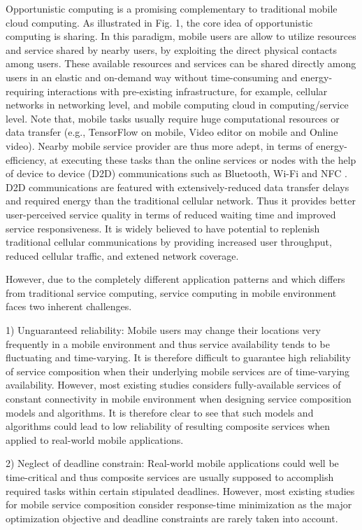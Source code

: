 \documentclass[journal]{IEEEtran}
\begin{document}
Opportunistic computing is a promising complementary to traditional mobile cloud computing. As illustrated in Fig. 1, the core idea of opportunistic computing is sharing. In this paradigm, mobile users are allow to utilize resources and service shared by nearby users, by exploiting the direct physical contacts among users.
These available resources and services can be shared directly among users in an elastic and on-demand way without time-consuming and energy-requiring interactions with pre-existing infrastructure, for example, cellular networks in networking level, and mobile computing cloud in computing/service level.
Note that, mobile tasks usually require huge computational resources or data transfer (e.g., TensorFlow on mobile, Video editor on mobile and Online video). Nearby mobile service provider are thus more adept, in terms of energy-efficiency, at executing these tasks than the online services or nodes with the help of device to device (D2D) communications such as Bluetooth, Wi-Fi and NFC \cite{balani2007energy}. D2D communications are featured with extensively-reduced data transfer delays and required energy than the traditional cellular network. Thus it provides better user-perceived service quality in terms of reduced waiting time and improved service responsiveness. It is widely believed to have potential to replenish traditional cellular communications by providing increased user throughput, reduced cellular traffic, and extened network coverage.

However, due to the completely different application patterns and which differs from traditional service computing, service computing in mobile environment faces two inherent challenges.

1) Unguaranteed reliability: Mobile users may change their locations very frequently in a mobile environment and thus service availability tends to be fluctuating and time-varying. It is therefore difficult to guarantee high reliability of service composition when their underlying mobile services are of time-varying availability. However, most existing studies considers fully-available services of constant connectivity in mobile environment when designing service composition models and algorithms. It is therefore clear to see that such models and algorithms could lead to low reliability of resulting composite services when applied to real-world mobile applications.

2) Neglect of deadline constrain: Real-world mobile applications could well be time-critical and thus composite services are usually supposed to accomplish required tasks within certain stipulated deadlines. However, most existing studies for mobile service composition consider response-time minimization as the major optimization objective and deadline constraints are rarely taken into account.
\end{document}
